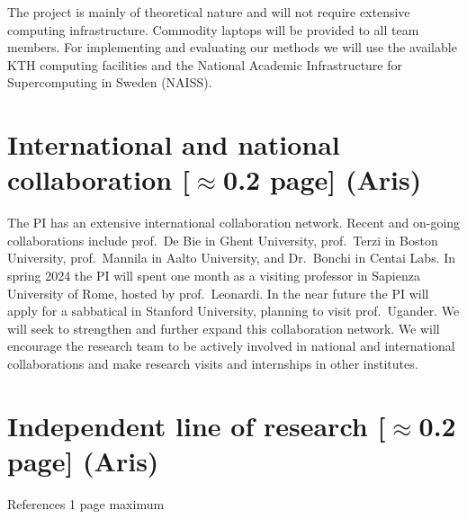 \documentclass[a4paper,11pt]{article}
\begin{document}

The project is mainly of theoretical nature and will not require extensive computing infrastructure. 
Commodity laptops will be provided to all team members. 
For implementing and evaluating our methods we will use the available 
KTH computing facilities
and the National Academic Infrastructure for Supercomputing in Sweden (NAISS).

\section{International and national collaboration {\color{orange}[$\approx$0.2 page]} {\color{teal}(Aris)}}


The PI has an extensive international collaboration network. 
Recent and on-going collaborations include
prof.\ De Bie in Ghent University, 
prof.\ Terzi in Boston University,
prof.\ Mannila in Aalto University, and 
Dr.\ Bonchi in Centai Labs.
In spring 2024 the PI will spent one month as a visiting professor 
in Sapienza University of Rome, hosted by prof.\ Leonardi.
In the near future the PI will apply for a sabbatical in Stanford University, 
planning to visit prof.\ Ugander. 
We will seek to strengthen and further expand this collaboration network.
We will encourage the research team to be actively involved in national and international collaborations
and make research visits and internships in other institutes.

\section{Independent line of research {\color{orange}[$\approx$0.2 page]} {\color{teal}(Aris)}}




{\small
\setlength{\bibsep}{0pt}


}

{\color{orange}References 1 page maximum} 

% 
\end{document}

